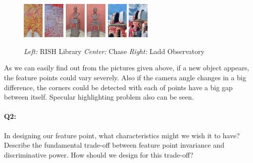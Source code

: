 \begin{figure}[h]
    \centering
    \includegraphics[width=1cm]{RL1.png}
    \includegraphics[width=1cm]{RL2.png}
    \includegraphics[width=1cm]{C1.png}
    \includegraphics[width=1cm]{C2.png}
    \includegraphics[width=1cm]{LO1.png}
    \includegraphics[width=1cm]{LO2.png}
    \caption{\emph{Left:} RISH Library \emph{Center:} Chase \emph{Right:} Ladd Observatory}
    \label{fig:result1}
\end{figure}

As we can easily find out from the pictures given above, if a new object appears, the feature points could vary severely. Also if the camera angle changes in a big difference, the corners could be detected with each of points have a big gap between itself. Specular highlighting problem also can be seen.


\pagebreak
\paragraph{Q2:} In designing our feature point, what characteristics might we wish it to have? Describe the fundamental trade-off between feature point invariance and discriminative power. How should we design for this trade-off?


